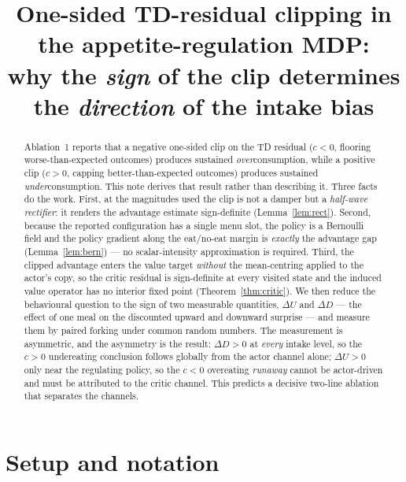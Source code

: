 \documentclass[11pt]{article}
\title{One-sided TD-residual clipping in the appetite-regulation MDP:\\
why the \emph{sign} of the clip determines the \emph{direction} of the intake bias}
\author{}
\date{}
\theoremstyle{definition}
\begin{document}
\maketitle

\begin{abstract}
\noindent
Ablation~1 reports that a negative one-sided clip on the TD residual
($c<0$, flooring worse-than-expected outcomes) produces sustained
\emph{over}consumption, while a positive clip ($c>0$, capping
better-than-expected outcomes) produces sustained \emph{under}consumption.
This note derives that result rather than describing it. Three facts do the
work. First, at the magnitudes used the clip is not a damper but a
\emph{half-wave rectifier}: it renders the advantage estimate sign-definite
(Lemma~\ref{lem:rect}). Second, because the reported configuration has a
single menu slot, the policy is a Bernoulli field and the policy gradient
along the eat/no-eat margin is \emph{exactly} the advantage gap
(Lemma~\ref{lem:bern}) --- no scalar-intensity approximation is required.
Third, the clipped advantage enters the value target \emph{without} the
mean-centring applied to the actor's copy, so the critic residual is
sign-definite at every visited state and the induced value operator has no
interior fixed point (Theorem~\ref{thm:critic}). We then reduce the
behavioural question to the sign of two measurable quantities, $\Delta U$ and
$\Delta D$ --- the effect of one meal on the discounted upward and downward
surprise --- and measure them by paired forking under common random numbers.
The measurement is asymmetric, and the asymmetry is the result: $\Delta D>0$
at \emph{every} intake level, so the $c>0$ undereating conclusion follows
globally from the actor channel alone; $\Delta U>0$ only near the regulating
policy, so the $c<0$ overeating \emph{runaway} cannot be actor-driven and must
be attributed to the critic channel. This predicts a decisive two-line
ablation that separates the channels.
\end{abstract}

\section{Setup and notation}
\label{sec:setup}
\end{document}
